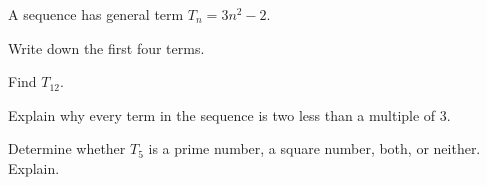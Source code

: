 A sequence has general term $T_n=3n^2-2$.
\begin{subparts}
  \item Write down the first four terms.
  \item Find $T_{12}$.
  \item Explain why every term in the sequence is two less than a multiple of $3$.
  \item Determine whether $T_5$ is a prime number, a square number, both, or neither. Explain.
\end{subparts}
